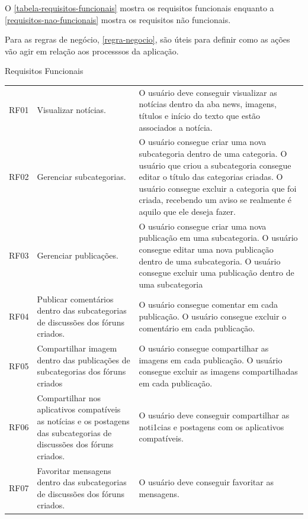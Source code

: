 O  \autoref{tabela-requisitos-funcionais} mostra os requisitos funcionais  enquanto a \autoref{requisitos-nao-funcionais} mostra os requisitos não funcionais. 

Para as regras de negócio, \autoref{regra-negocio}, são úteis para definir como as ações vão agir em relação aos processsos da aplicação. 



\begin{quadro}[htb]
	\centering
	\ABNTEXfontereduzida
	\caption[Requisitos Funcionais]{Requisitos Funcionais}
	\label{tabela-requisitos-funcionais}
\end{quadro}
\begin{longtable}{|p{2.0cm}|p{6.5cm}|p{6.5cm}|}
	\hline
	\thead{Código} & \thead{Requisito}  & \thead{Descrição} \\
	\hline
	RF01 &Visualizar notícias.  & O usuário deve conseguir visualizar as notícias dentro da aba news, imagens, títulos e início do texto que estão associados a notícia.\\
	\hline
	RF02 & Gerenciar subcategorias. &
	O usuário consegue criar uma nova subcategoria dentro de uma categoria.
	O usuário que criou a subcategoria consegue editar o título das categorias criadas.
	O usuário consegue excluir a categoria que foi criada, recebendo um aviso se realmente é aquilo que ele deseja fazer.
	\\
	\hline
	RF03 & Gerenciar publicações.   & O usuário consegue criar uma nova publicação em uma subcategoria. 
	O usuário consegue editar uma nova publicação dentro de uma subcategoria. 
	O usuário consegue excluir uma publicação dentro de uma subcategoria\\
	\hline
	RF04 & Publicar comentários dentro das subcategorias de discussões dos fóruns criados. & O usuário consegue comentar em cada publicação. O usuário consegue excluir o comentário em cada publicação. \\
	\hline
	RF05 & Compartilhar imagem dentro das publicações de subcategorias dos fóruns criados &
	O usuário consegue compartilhar as imagens em cada publicação. O usuário consegue excluir as imagens compartilhadas em cada publicação.\\
	\hline
	RF06 & Compartilhar nos aplicativos compatíveis as notícias e os postagens das subcategorias de discussões dos fóruns criados.  & O usuário deve conseguir compartilhar as noti1cias e postagens com os aplicativos compatíveis.\\
	\hline
	RF07 & Favoritar mensagens dentro das subcategorias de discussões dos fóruns criados. & O usuário deve conseguir favoritar as mensagens. \\

\end{longtable}
